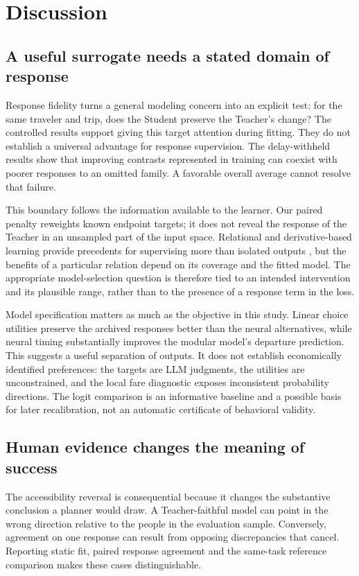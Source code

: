 \section{Discussion}
\label{sec:discussion}
\subsection{A useful surrogate needs a stated domain of response}
Response fidelity turns a general modeling concern into an explicit test: for the same traveler and trip, does the Student preserve the Teacher's change? The controlled results support giving this target attention during fitting. They do not establish a universal advantage for response supervision. The delay-withheld results show that improving contrasts represented in training can coexist with poorer responses to an omitted family. A favorable overall average cannot resolve that failure.

This boundary follows the information available to the learner. Our paired penalty reweights known endpoint targets; it does not reveal the response of the Teacher in an unsampled part of the input space. Relational and derivative-based learning provide precedents for supervising more than isolated outputs \citep{park2019relational,czarnecki2017sobolev}, but the benefits of a particular relation depend on its coverage and the fitted model. The appropriate model-selection question is therefore tied to an intended intervention and its plausible range, rather than to the presence of a response term in the loss.

Model specification matters as much as the objective in this study. Linear choice utilities preserve the archived responses better than the neural alternatives, while neural timing substantially improves the modular model's departure prediction. This suggests a useful separation of outputs. It does not establish economically identified preferences: the targets are LLM judgments, the utilities are unconstrained, and the local fare diagnostic exposes inconsistent probability directions. The logit comparison is an informative baseline and a possible basis for later recalibration, not an automatic certificate of behavioral validity.

\subsection{Human evidence changes the meaning of success}
The accessibility reversal is consequential because it changes the substantive conclusion a planner would draw. A Teacher-faithful model can point in the wrong direction relative to the people in the evaluation sample. Conversely, agreement on one response can result from opposing discrepancies that cancel. Reporting static fit, paired response agreement and the same-task reference comparison makes these cases distinguishable.

